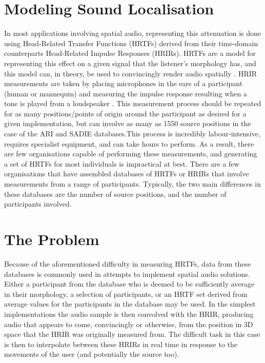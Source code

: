 \section{Modeling Sound Localisation} %
In most applications involving spatial audio, representing this attenuation is done using Head-Related Transfer Functions (HRTFs) derived from their time-domain counterparts Head-Related Impulse Responses (HRIRs). HRTFs are a model for representing this effect on a given signal that the listener's morphology has, and this model can, in theory, be used to convincingly render audio spatially \citep{Bronkhorst1995} \citep{Begault2000}. HRIR measurements are taken by placing microphones in the ears of a participant (human or mannequin) and measuring the impulse response resulting when a tone is played from a loudspeaker \citep{gardner1995} \citep{Algazi2001}. This measurement process should be repeated for as many positions/points of origin around the participant as desired for a given implementation, but can involve as many as 1550 source positions in the case of the ARI\citep{arisite} and SADIE\citep{sadiesite} databases.This process is incredibly labour-intensive, requires specialist equipment, and can take hours to perform. As a result, there are few organisations capable of performing these measurements, and generating a set of HRTFs for most individuals is impractical at best. There are a few organisations that have assembled databases of HRTFs or HRIRs that involve measurements from a range of participants. Typically, the two main differences in these databases are the number of source positions, and the number of participants involved.

\section{The Problem}
Because of the aforementioned difficulty in measuring HRTFs, data from these databases is commonly used in attempts to implement spatial audio solutions. Either a participant from the database who is deemed to be sufficiently average in their morphology, a selection of participants, or an HRTF set derived from average values for the participants in the database may be used. In the simplest implementations the audio sample is then convolved with the HRIR, producing audio that appears to come, convincingly or otherwise, from the position in 3D space that the HRIR was originally measured from. The difficult task in this case is then to interpolate between these HRIRs in real time in response to the movements of the user (and potentially the source too).  

